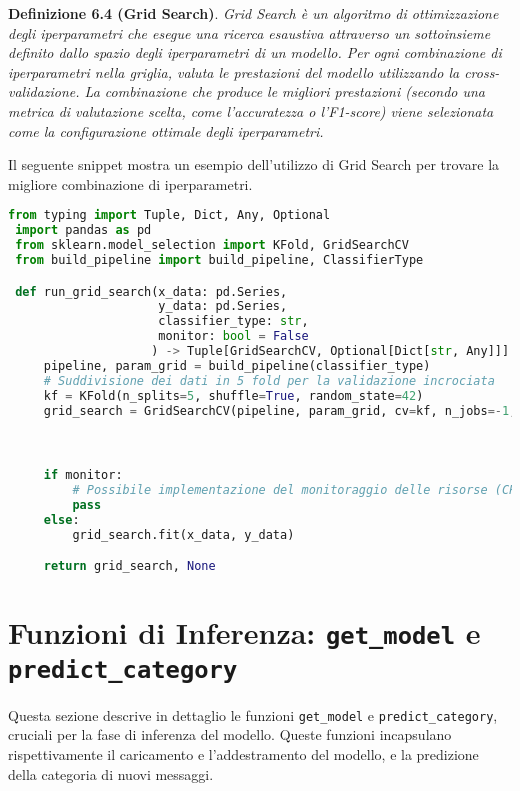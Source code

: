  \textbf{Definizione 6.4 (Grid Search)}. \textit{Grid Search è un algoritmo di ottimizzazione degli iperparametri che esegue una ricerca esaustiva attraverso un sottoinsieme definito dallo spazio degli iperparametri di un modello. Per ogni combinazione di iperparametri nella griglia, valuta le prestazioni del modello utilizzando la cross-validazione. La combinazione che produce le migliori prestazioni (secondo una metrica di valutazione scelta, come l'accuratezza o l'F1-score) viene selezionata come la configurazione ottimale degli iperparametri.}

 Il seguente snippet mostra un esempio dell'utilizzo di Grid Search per trovare la migliore combinazione di iperparametri.

 \begin{lstlisting}[language=Python]
 from typing import Tuple, Dict, Any, Optional
 import pandas as pd
 from sklearn.model_selection import KFold, GridSearchCV
 from build_pipeline import build_pipeline, ClassifierType

 def run_grid_search(x_data: pd.Series,
                     y_data: pd.Series,
                     classifier_type: str,
                     monitor: bool = False
                    ) -> Tuple[GridSearchCV, Optional[Dict[str, Any]]]:
     pipeline, param_grid = build_pipeline(classifier_type)
     # Suddivisione dei dati in 5 fold per la validazione incrociata
     kf = KFold(n_splits=5, shuffle=True, random_state=42)
     grid_search = GridSearchCV(pipeline, param_grid, cv=kf, n_jobs=-1, verbose=0)



     if monitor:
         # Possibile implementazione del monitoraggio delle risorse (CPU, memoria, tempo)
         pass
     else:
         grid_search.fit(x_data, y_data)

     return grid_search, None
 \end{lstlisting}

 \section{Funzioni di Inferenza: \texttt{get\_model} e \texttt{predict\_category}}

 Questa sezione descrive in dettaglio le funzioni \texttt{get\_model} e \texttt{predict\_category}, cruciali per la fase di inferenza del modello. Queste funzioni incapsulano rispettivamente il caricamento e l'addestramento del modello, e la predizione della categoria di nuovi messaggi.

